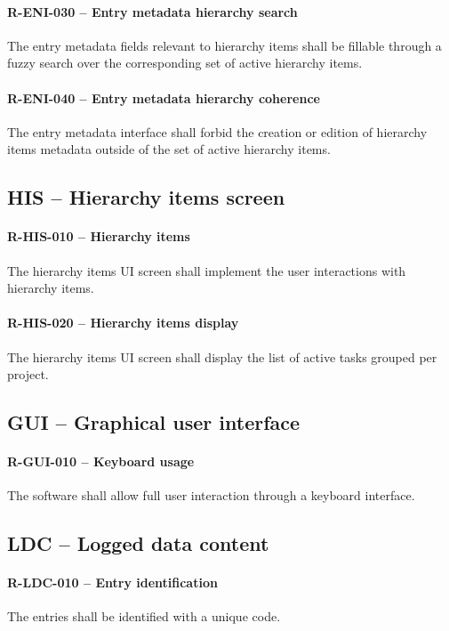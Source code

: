 \paragraph{R-ENI-030 -- Entry metadata hierarchy search}
The entry metadata fields relevant to hierarchy items shall be fillable
through a fuzzy search over the corresponding set of active hierarchy items.

\paragraph{R-ENI-040 -- Entry metadata hierarchy coherence}
The entry metadata interface shall forbid the creation or edition of
hierarchy items metadata outside of the set of active hierarchy items.

\subsection{HIS -- Hierarchy items screen}
\paragraph{R-HIS-010 -- Hierarchy items}
The hierarchy items UI screen shall implement the user interactions with
hierarchy items.

\paragraph{R-HIS-020 -- Hierarchy items display}
The hierarchy items UI screen shall display the list of active tasks
grouped per project.

\subsection{GUI -- Graphical user interface}
\paragraph{R-GUI-010 -- Keyboard usage}
The software shall allow full user interaction through a keyboard interface.

\subsection{LDC -- Logged data content}
\paragraph{R-LDC-010 -- Entry identification}
The entries shall be identified with a unique code.

